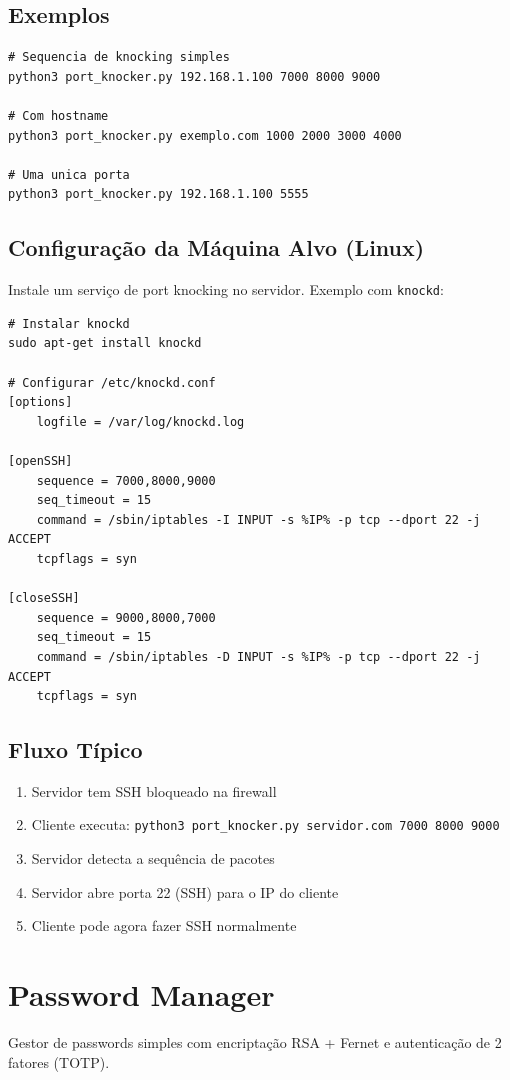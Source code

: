 \documentclass[11pt,a4paper]{article}
\begin{document}
\subsection{Exemplos}
\begin{lstlisting}[style=bash]
# Sequencia de knocking simples
python3 port_knocker.py 192.168.1.100 7000 8000 9000

# Com hostname
python3 port_knocker.py exemplo.com 1000 2000 3000 4000

# Uma unica porta
python3 port_knocker.py 192.168.1.100 5555
\end{lstlisting}

\subsection{Configura\c{c}\~ao da M\'aquina Alvo (Linux)}
Instale um servi\c{c}o de port knocking no servidor. Exemplo com \texttt{knockd}:

\begin{lstlisting}[style=bash]
# Instalar knockd
sudo apt-get install knockd

# Configurar /etc/knockd.conf
[options]
    logfile = /var/log/knockd.log

[openSSH]
    sequence = 7000,8000,9000
    seq_timeout = 15
    command = /sbin/iptables -I INPUT -s %IP% -p tcp --dport 22 -j ACCEPT
    tcpflags = syn

[closeSSH]
    sequence = 9000,8000,7000
    seq_timeout = 15
    command = /sbin/iptables -D INPUT -s %IP% -p tcp --dport 22 -j ACCEPT
    tcpflags = syn
\end{lstlisting}

\subsection{Fluxo T\'ipico}
\begin{enumerate}[itemsep=2pt]
  \item Servidor tem SSH bloqueado na firewall
  \item Cliente executa: \texttt{python3 port\_knocker.py servidor.com 7000 8000 9000}
  \item Servidor detecta a sequ\^encia de pacotes
  \item Servidor abre porta 22 (SSH) para o IP do cliente
  \item Cliente pode agora fazer SSH normalmente
\end{enumerate}

\section{Password Manager}
Gestor de passwords simples com encripta\c{c}\~ao RSA + Fernet e autentica\c{c}\~ao de 2 fatores (TOTP).
\end{document}
